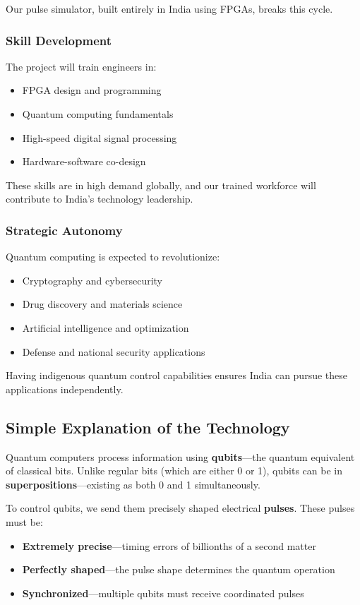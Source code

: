 \documentclass[12pt,a4paper]{article}
\theoremstyle{definition}
\begin{document}
Our pulse simulator, built entirely in India using FPGAs, breaks this cycle.

\subsubsection{Skill Development}
The project will train engineers in:
\begin{itemize}
    \item FPGA design and programming
    \item Quantum computing fundamentals
    \item High-speed digital signal processing
    \item Hardware-software co-design
\end{itemize}

These skills are in high demand globally, and our trained workforce will contribute to India's technology leadership.

\subsubsection{Strategic Autonomy}
Quantum computing is expected to revolutionize:
\begin{itemize}
    \item Cryptography and cybersecurity
    \item Drug discovery and materials science
    \item Artificial intelligence and optimization
    \item Defense and national security applications
\end{itemize}

Having indigenous quantum control capabilities ensures India can pursue these applications independently.

\subsection{Simple Explanation of the Technology}

Quantum computers process information using \textbf{qubits}---the quantum equivalent of classical bits. Unlike regular bits (which are either 0 or 1), qubits can be in \textbf{superpositions}---existing as both 0 and 1 simultaneously.

To control qubits, we send them precisely shaped electrical \textbf{pulses}. These pulses must be:
\begin{itemize}
    \item \textbf{Extremely precise}---timing errors of billionths of a second matter
    \item \textbf{Perfectly shaped}---the pulse shape determines the quantum operation
    \item \textbf{Synchronized}---multiple qubits must receive coordinated pulses
\end{itemize}
\end{document}

